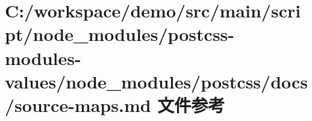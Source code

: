 \hypertarget{postcss-modules-values_2node__modules_2postcss_2docs_2source-maps_8md}{}\section{C\+:/workspace/demo/src/main/script/node\+\_\+modules/postcss-\/modules-\/values/node\+\_\+modules/postcss/docs/source-\/maps.md 文件参考}
\label{postcss-modules-values_2node__modules_2postcss_2docs_2source-maps_8md}
